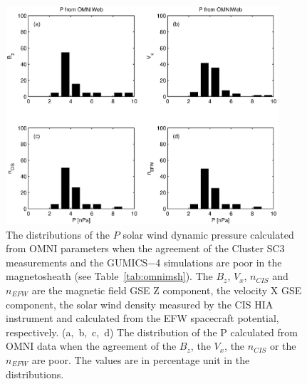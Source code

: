 \documentclass[linenumbers,draft]{agujournal}
\begin{document}
\begin{figure}[h]
\centering
\includegraphics[width=0.9\textwidth,angle=0]{swe-2020-corr-f19.eps}
\caption{The distributions of the $P$ solar wind dynamic pressure calculated from OMNI parameters when the agreement of the Cluster SC3 measurements and the GUMICS$-$4 simulations are poor in the magnetosheath (see Table~\ref{tab:omnimsh}). The $B_{z}$, $V_{x}$, $n_{CIS}$ and $n_{EFW}$ are the magnetic field GSE Z component, the velocity X GSE component, the solar wind density measured by the CIS HIA instrument and calculated from the EFW spacecraft potential, respectively. (a,~b,~c,~d) The distribution of the P calculated from OMNI data when the agreement of the $B_{z}$, the $V_{x}$, the $n_{CIS}$ or the $n_{EFW}$ are poor. The values are in percentage unit in the distributions.}
\label{fig:mshomnip}
\end{figure}

\pagebreak
\end{document}
